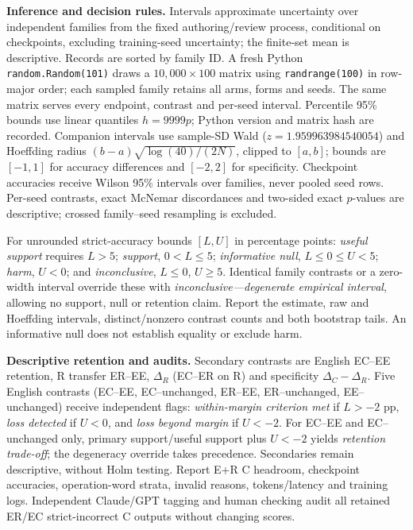 \noindent\textbf{Inference and decision rules.} Intervals approximate uncertainty over independent families from the fixed authoring/review process, conditional on checkpoints, excluding training-seed uncertainty; the finite-set mean is descriptive. Records are sorted by family ID. A fresh Python \texttt{random.Random(101)} draws a $10{,}000\times100$ matrix using \texttt{randrange(100)} in row-major order; each sampled family retains all arms, forms and seeds. The same matrix serves every endpoint, contrast and per-seed interval. Percentile 95\% bounds use linear quantiles $h=9999p$; Python version and matrix hash are recorded. Companion intervals use sample-SD Wald ($z=1.959963984540054$) and Hoeffding radius $(b-a)\sqrt{\log(40)/(2N)}$, clipped to $[a,b]$; bounds are $[-1,1]$ for accuracy differences and $[-2,2]$ for specificity. Checkpoint accuracies receive Wilson 95\% intervals over families, never pooled seed rows. Per-seed contrasts, exact McNemar discordances and two-sided exact $p$-values are descriptive; crossed family--seed resampling is excluded.

For unrounded strict-accuracy bounds $[L,U]$ in percentage points: \emph{useful support} requires $L>5$; \emph{support}, $0<L\leq5$; \emph{informative null}, $L\leq0\leq U<5$; \emph{harm}, $U<0$; and \emph{inconclusive}, $L\leq0$, $U\geq5$. Identical family contrasts or a zero-width interval override these with \emph{inconclusive---degenerate empirical interval}, allowing no support, null or retention claim. Report the estimate, raw and Hoeffding intervals, distinct/nonzero contrast counts and both bootstrap tails. An informative null does not establish equality or exclude harm.

\noindent\textbf{Descriptive retention and audits.} Secondary contrasts are English EC--EE retention, R transfer ER--EE, $\Delta_R$ (EC--ER on R) and specificity $\Delta_C-\Delta_R$. Five English contrasts (EC--EE, EC--unchanged, ER--EE, ER--unchanged, EE--unchanged) receive independent flags: \emph{within-margin criterion met} if $L>-2$ pp, \emph{loss detected} if $U<0$, and \emph{loss beyond margin} if $U<-2$. For EC--EE and EC--unchanged only, primary support/useful support plus $U<-2$ yields \emph{retention trade-off}; the degeneracy override takes precedence. Secondaries remain descriptive, without Holm testing. Report E+R C headroom, checkpoint accuracies, operation-word strata, invalid reasons, tokens/latency and training logs. Independent Claude/GPT tagging and human checking audit all retained ER/EC strict-incorrect C outputs without changing scores.

